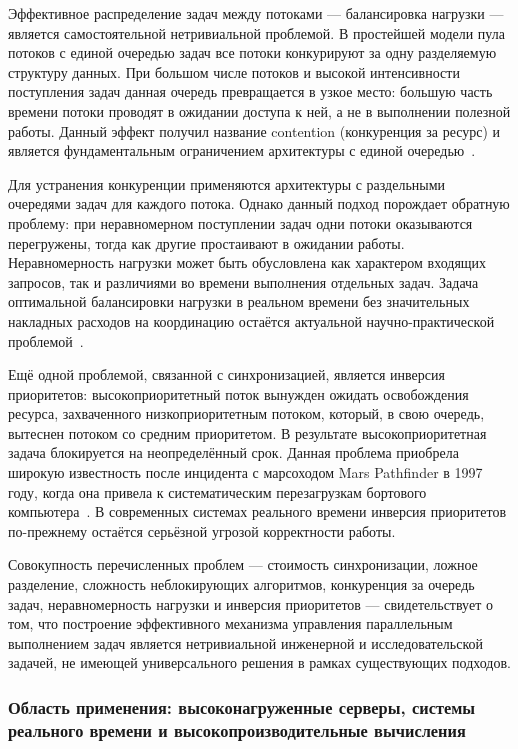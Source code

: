 Эффективное распределение задач между потоками --- балансировка нагрузки --- является самостоятельной нетривиальной проблемой. В простейшей модели пула потоков с единой очередью задач все потоки конкурируют за одну разделяемую структуру данных. При большом числе потоков и высокой интенсивности поступления задач данная очередь превращается в узкое место: большую часть времени потоки проводят в ожидании доступа к ней, а не в выполнении полезной работы. Данный эффект получил название contention (конкуренция за ресурс) и является фундаментальным ограничением архитектуры с единой очередью~\cite{Blumofe1999}.

Для устранения конкуренции применяются архитектуры с раздельными очередями задач для каждого потока. Однако данный подход порождает обратную проблему: при неравномерном поступлении задач одни потоки оказываются перегружены, тогда как другие простаивают в ожидании работы. Неравномерность нагрузки может быть обусловлена как характером входящих запросов, так и различиями во времени выполнения отдельных задач. Задача оптимальной балансировки нагрузки в реальном времени без значительных накладных расходов на координацию остаётся актуальной научно-практической проблемой~\cite{Acar2000}.

Ещё одной проблемой, связанной с синхронизацией, является инверсия приоритетов: высокоприоритетный поток вынужден ожидать освобождения ресурса, захваченного низкоприоритетным потоком, который, в свою очередь, вытеснен потоком со средним приоритетом. В результате высокоприоритетная задача блокируется на неопределённый срок. Данная проблема приобрела широкую известность после инцидента с марсоходом Mars Pathfinder в 1997 году, когда она привела к систематическим перезагрузкам бортового компьютера~\cite{Reeves1998}. В современных системах реального времени инверсия приоритетов по-прежнему остаётся серьёзной угрозой корректности работы.

Совокупность перечисленных проблем --- стоимость синхронизации, ложное разделение, сложность неблокирующих алгоритмов, конкуренция за очередь задач, неравномерность нагрузки и инверсия приоритетов --- свидетельствует о том, что построение эффективного механизма управления параллельным выполнением задач является нетривиальной инженерной и исследовательской задачей, не имеющей универсального решения в рамках существующих подходов.

\subsubsection{Область применения: высоконагруженные серверы, системы реального времени и высокопроизводительные вычисления}

